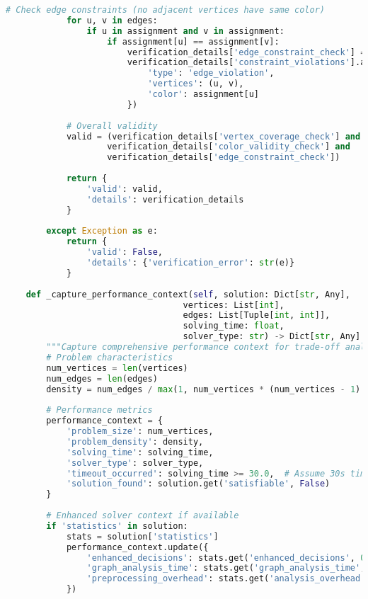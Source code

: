 \begin{lstlisting}[language=Python, caption=Independent Solution Validation with Trade-off Context]
            # Check edge constraints (no adjacent vertices have same color)
            for u, v in edges:
                if u in assignment and v in assignment:
                    if assignment[u] == assignment[v]:
                        verification_details['edge_constraint_check'] = False
                        verification_details['constraint_violations'].append({
                            'type': 'edge_violation',
                            'vertices': (u, v),
                            'color': assignment[u]
                        })
            
            # Overall validity
            valid = (verification_details['vertex_coverage_check'] and 
                    verification_details['color_validity_check'] and 
                    verification_details['edge_constraint_check'])
            
            return {
                'valid': valid,
                'details': verification_details
            }
            
        except Exception as e:
            return {
                'valid': False,
                'details': {'verification_error': str(e)}
            }
    
    def _capture_performance_context(self, solution: Dict[str, Any], 
                                   vertices: List[int], 
                                   edges: List[Tuple[int, int]],
                                   solving_time: float,
                                   solver_type: str) -> Dict[str, Any]:
        """Capture comprehensive performance context for trade-off analysis"""
        # Problem characteristics
        num_vertices = len(vertices)
        num_edges = len(edges)
        density = num_edges / max(1, num_vertices * (num_vertices - 1) // 2)
        
        # Performance metrics
        performance_context = {
            'problem_size': num_vertices,
            'problem_density': density,
            'solving_time': solving_time,
            'solver_type': solver_type,
            'timeout_occurred': solving_time >= 30.0,  # Assume 30s timeout
            'solution_found': solution.get('satisfiable', False)
        }
        
        # Enhanced solver context if available
        if 'statistics' in solution:
            stats = solution['statistics']
            performance_context.update({
                'enhanced_decisions': stats.get('enhanced_decisions', 0),
                'graph_analysis_time': stats.get('graph_analysis_time', 0.0),
                'preprocessing_overhead': stats.get('analysis_overhead', 0.0)
            })
        

\end{lstlisting}
